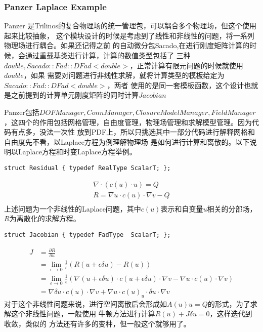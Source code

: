 \subsubsection{Panzer Laplace Example}
Panzer 是Trilinos的复合物理场的统一管理包，可以耦合多个物理场，但这个使用起来比较抽象，
这个模块设计的时候是考虑到了线性和非线性的问题，将一系列物理场进行耦合。如果还记得之前
的自动微分包Sacado,在进行刚度矩阵计算的时候，会通过重载基类进行计算，计算的数值类型包括了
三种$double,Sacado::Fad::DFad<double>$，正常计算有限元问题的时候就使用$double$，如果
需要对问题进行非线性求解，就将计算类型的模板给定为$Sacado::Fad::DFad<double>$，两者
使用的是同一套模板函数，这个设计也就是之前提到的计算单元刚度矩阵的同时计算$Jacobian$

Panzer包括$DOFManager,ConnManager,ClosureModelManager,FieldManager$，这四个的作用包括网格管理，自由度管理，物理场管理和求解模型管理。因为代码有点多，没法一次性
放到PDF上，所以只挑选其中一部分代码进行解释网格和自由度先不看，以Laplace方程为例理解物理场
是如何进行计算和离散的。以下说明以Laplace方程和时变Laplace方程举例。

\begin{lstlisting}
struct Residual { typedef RealType ScalarT; };
\end{lstlisting}
\[
\begin{aligned}
    \nabla\cdot (c(u) \cdot u) = Q \\
    R = \nabla u \cdot c(u) \cdot\nabla v - Q \\
\end{aligned}
\]
上述问题为一个非线性的Laplace问题，其中$c(u)$表示和自变量$u$相关的分部场，$R$为离散化的求解方程。

\begin{lstlisting}
struct Jacobian { typedef FadType  ScalarT; };
\end{lstlisting}
\[
\begin{aligned}
    J &= \frac{\partial R}{\partial u} \\
      &= \lim_{\epsilon\rightarrow 0}\frac{1}{\epsilon}
        (R(u+\epsilon \delta u) - R(u))\\
      &= \lim_{\epsilon\rightarrow 0}\frac{1}{\epsilon}
         (\nabla (u+\epsilon \delta u) \cdot c(u+\epsilon \delta u)\cdot \nabla v 
        -\nabla u \cdot c(u) \cdot\nabla v) \\
      &= \nabla \delta u \cdot c(u) \cdot\nabla v + 
          \nabla u\cdot c(u)_u \cdot \delta u \cdot \nabla v
\end{aligned}
\]
对于这个非线性问题来说，进行空间离散后会形成如$A(u)u=Q$的形式，为了求解这个非线性问题，一般使用
牛顿方法进行计算$R(u)+J \delta u = 0$，这样迭代到收敛，类似的
方法还有许多的变种，但一般这个就够用了。

